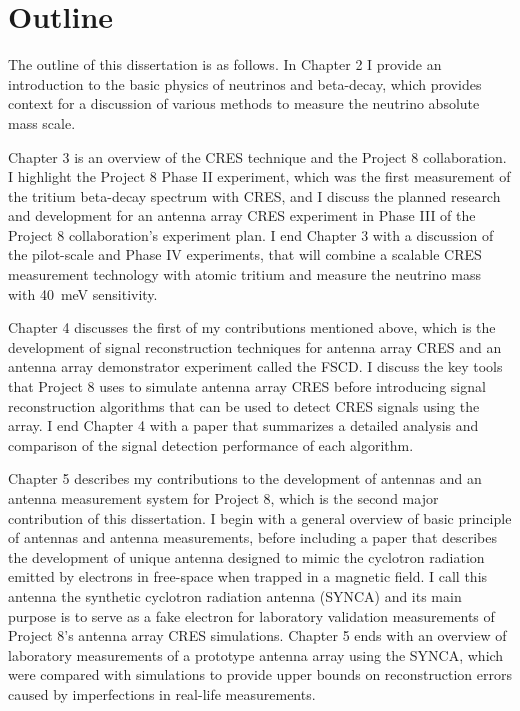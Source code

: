 \section{Outline}

The outline of this dissertation is as follows. In Chapter 2 I provide an introduction to the basic physics of neutrinos and beta-decay, which provides context for a discussion of various methods to measure the neutrino absolute mass scale. 

Chapter 3 is an overview of the CRES technique and the Project 8 collaboration. I highlight the Project 8 Phase II experiment, which was the first measurement of the tritium beta-decay spectrum with CRES, and I discuss the planned research and development for an antenna array CRES experiment in Phase III of the Project 8 collaboration's experiment plan. I end Chapter 3 with a discussion of the pilot-scale and Phase IV experiments, that will combine a scalable CRES measurement technology with atomic tritium and measure the neutrino mass with 40~meV sensitivity.

Chapter 4 discusses the first of my contributions mentioned above, which is the development of signal reconstruction techniques for antenna array CRES and an antenna array demonstrator experiment called the FSCD. I discuss the key tools that Project 8 uses to simulate antenna array CRES before introducing signal reconstruction algorithms that can be used to detect CRES signals using the array. I end Chapter 4 with a paper that summarizes a detailed analysis and comparison of the signal detection performance of each algorithm.

Chapter 5 describes my contributions to the development of antennas and an antenna measurement system for Project 8, which is the second major contribution of this dissertation. I begin with a general overview of basic principle of antennas and antenna measurements, before including a paper that describes the development of unique antenna designed to mimic the cyclotron radiation emitted by electrons in free-space when trapped in a magnetic field. I call this antenna the synthetic cyclotron radiation antenna (SYNCA) and its main purpose is to serve as a fake electron for laboratory validation measurements of Project 8's antenna array CRES simulations. Chapter 5 ends with an overview of laboratory measurements of a prototype antenna array using the SYNCA, which were compared with simulations to provide upper bounds on reconstruction errors caused by imperfections in real-life measurements.

